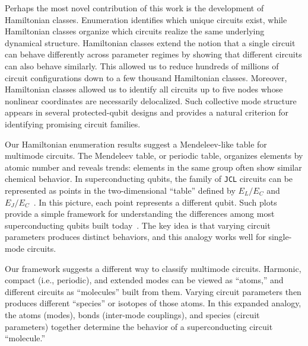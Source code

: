 Perhaps the most novel contribution of this work is the development of Hamiltonian classes.
Enumeration identifies which unique circuits exist, while Hamiltonian classes organize which circuits realize the same underlying dynamical structure.
Hamiltonian classes extend the notion that a single circuit can behave differently across parameter regimes by showing that different circuits can also behave similarly.
This allowed us to reduce hundreds of millions of circuit configurations down to a few thousand  Hamiltonian classes. 
Moreover, Hamiltonian classes allowed us to identify all circuits up to five nodes whose nonlinear coordinates are necessarily delocalized. Such collective mode structure appears in several protected-qubit designs and provides a natural criterion for identifying promising circuit families.



Our Hamiltonian enumeration results suggest a Mendeleev-like table for multimode circuits. The Mendeleev table, or periodic table, organizes elements by atomic number and reveals trends: elements in the same group often show similar chemical behavior. In superconducting qubits, the family of \texttt{JCL} circuits can be represented as points in the two-dimensional ``table'' defined by $E_L/E_C$ and $E_J/E_C$~\cite{hyyppa_unimon_2022,kalacheva_kinemon_2023}. In this picture, each point represents a different qubit. Such plots provide a simple framework for understanding the differences among most superconducting qubits built today~\cite{devoret2013}. The key idea is that varying circuit parameters produces distinct behaviors, and this analogy works well for single-mode circuits.

Our framework suggests a different way to classify multimode circuits. Harmonic, compact (i.e., periodic), and extended modes can be viewed as ``atoms,'' and different circuits as ``molecules'' built from them. Varying circuit parameters then produces different ``species'' or isotopes of those atoms. In this expanded analogy, the atoms (modes), bonds (inter-mode couplings), and species (circuit parameters) together determine the behavior of a superconducting circuit ``molecule.''
